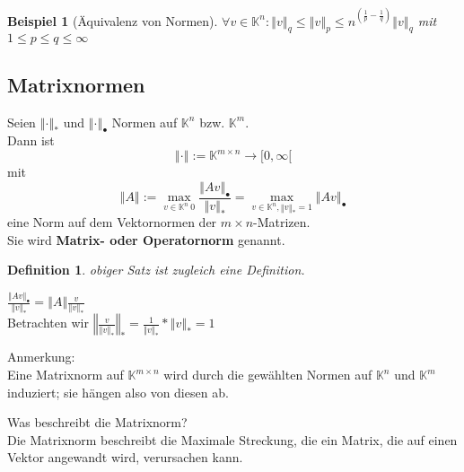 \documentclass[a4paper,10pt]{article}
\newcommand{\norm}[1]{ \left\Vert #1 \right\Vert }
\newtheorem[L]{satz}{Satz}[section]
\newtheorem{definition}{Definition}[section]
\newtheorem{bsp}{Beispiel}[section]
\newtheorem[S]{beweis}{Beweis}
\newtheorem[S]{beh}{Behauptung}
\begin{document}
\begin{bsp}[Äquivalenz von Normen]
$\forall v \in \mathbb{K}^n:
\norm{v}_q \leq \norm{v}_p \leq n^{(\frac{1}{p} - \frac{1}{q})} \norm{v}_q$ mit 
$1 \leq p \leq q \leq \infty$
\end{bsp}


\subsection{Matrixnormen}
\begin{satz}[Matrixnorm]
Seien $\norm{\cdot}_* $ und $ \norm{\cdot}_\bullet $ Normen auf $\mathbb{K}^n$ bzw. $\mathbb{K}^m$.\\
Dann ist $$ \norm{\cdot} := \mathbb{K}^{ m \times n} \rightarrow [0, \infty [ $$ mit
                                                                                                                                                                     $$\norm{A} := \max \limits_{v \in \mathbb{K}^n \ {0}} { \frac{\norm{Av}_\bullet}{\norm{v}_*}} = \max\limits_{v \in \mathbb{K}^n, \norm{v}_* = 1} { {\norm{Av}_\bullet}}$$
eine Norm auf dem Vektornormen der $m \times n$-Matrizen.\\
Sie wird \textbf{Matrix- oder Operatornorm} genannt.
\end{satz}

\begin{definition}
 obiger Satz ist zugleich eine Definition.
\end{definition}

\smallskip

\begin{beweis}
$\frac{\norm{Av}_\bullet}{\norm{v}_*} = \norm{A} \frac{v}{\norm{v}_*}$\\
Betrachten wir $\norm{\frac{v}{\norm{v}_*}}_* = \frac{1}{\norm{v}_*} * \norm{v}_* = 1$
\end{beweis}

\smallskip

Anmerkung:\\
Eine Matrixnorm auf $\mathbb{K}^{m 
\times n}$ wird durch die gewählten Normen auf $\mathbb{K}^n$ und $\mathbb{K}^m$ induziert; sie hängen also von diesen ab.\\

\smallskip

Was beschreibt die Matrixnorm?\\
Die Matrixnorm beschreibt die Maximale Streckung, die ein Matrix, die auf einen Vektor angewandt wird, verursachen kann.
\end{document}

